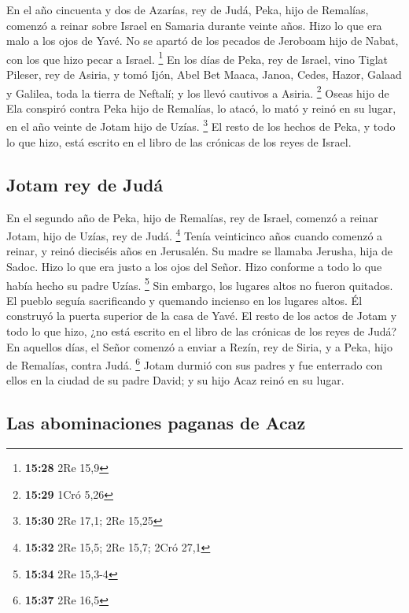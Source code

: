  En el año cincuenta y dos de Azarías, rey de Judá, Peka,
hijo de Remalías, comenzó a reinar sobre Israel en Samaria durante
veinte años.  Hizo lo que era malo a los ojos de Yavé. No
se apartó de los pecados de Jeroboam hijo de Nabat, con los que hizo
pecar a Israel. \footnote{\textbf{15:28} 2Re 15,9}  En
los días de Peka, rey de Israel, vino Tiglat Pileser, rey de Asiria, y
tomó Ijón, Abel Bet Maaca, Janoa, Cedes, Hazor, Galaad y Galilea, toda
la tierra de Neftalí; y los llevó cautivos a Asiria. \footnote{\textbf{15:29}
  1Cró 5,26}  Oseas hijo de Ela conspiró contra Peka hijo
de Remalías, lo atacó, lo mató y reinó en su lugar, en el año veinte de
Jotam hijo de Uzías. \footnote{\textbf{15:30} 2Re 17,1; 2Re 15,25}
 El resto de los hechos de Peka, y todo lo que hizo, está
escrito en el libro de las crónicas de los reyes de Israel.

\hypertarget{jotam-rey-de-juduxe1}{%
\subsection{Jotam rey de Judá}\label{jotam-rey-de-juduxe1}}

 En el segundo año de Peka, hijo de Remalías, rey de
Israel, comenzó a reinar Jotam, hijo de Uzías, rey de Judá. \footnote{\textbf{15:32}
  2Re 15,5; 2Re 15,7; 2Cró 27,1}  Tenía veinticinco años
cuando comenzó a reinar, y reinó dieciséis años en Jerusalén. Su madre
se llamaba Jerusha, hija de Sadoc.  Hizo lo que era justo
a los ojos del Señor. Hizo conforme a todo lo que había hecho su padre
Uzías. \footnote{\textbf{15:34} 2Re 15,3-4}  Sin embargo,
los lugares altos no fueron quitados. El pueblo seguía sacrificando y
quemando incienso en los lugares altos. Él construyó la puerta superior
de la casa de Yavé.  El resto de los actos de Jotam y
todo lo que hizo, ¿no está escrito en el libro de las crónicas de los
reyes de Judá?  En aquellos días, el Señor comenzó a
enviar a Rezín, rey de Siria, y a Peka, hijo de Remalías, contra Judá.
\footnote{\textbf{15:37} 2Re 16,5}  Jotam durmió con sus
padres y fue enterrado con ellos en la ciudad de su padre David; y su
hijo Acaz reinó en su lugar.

\hypertarget{las-abominaciones-paganas-de-acaz}{%
\subsection{Las abominaciones paganas de
Acaz}\label{las-abominaciones-paganas-de-acaz}}

